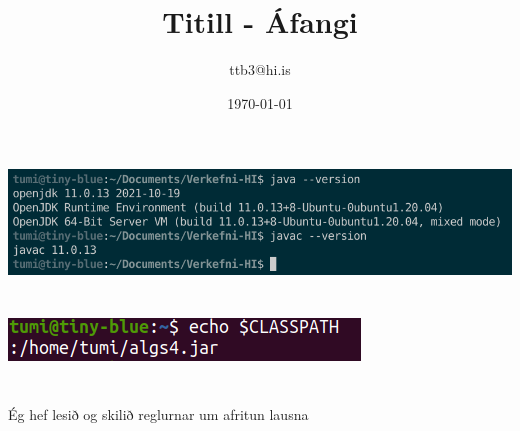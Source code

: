 \documentclass{article}
\title{Titill - Áfangi}
\author{ttb3@hi.is}
\date{\today}
\begin{document}
\maketitle


\section{}
\includegraphics[scale=0.4]{javas.png}

\section{}
\includegraphics[scale=1]{CLASSPATH.png}

\section{}
Ég hef lesið og skilið reglurnar um afritun lausna

\newpage
\end{document}
